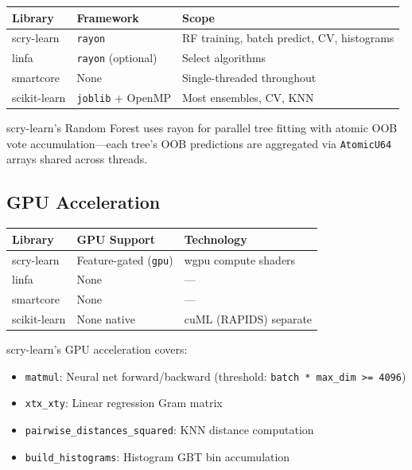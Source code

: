 \documentclass[11pt,a4paper]{article}
\begin{document}
\begin{center}
\begin{tabular}{lll}
\toprule
\textbf{Library} & \textbf{Framework} & \textbf{Scope} \\
\midrule
scry-learn & \texttt{rayon} & RF training, batch predict, CV, histograms \\
linfa & \texttt{rayon} (optional) & Select algorithms \\
smartcore & None & Single-threaded throughout \\
scikit-learn & \texttt{joblib} + OpenMP & Most ensembles, CV, KNN \\
\bottomrule
\end{tabular}
\end{center}

scry-learn's Random Forest uses rayon for parallel tree fitting with atomic OOB vote accumulation---each tree's OOB predictions are aggregated via \texttt{AtomicU64} arrays shared across threads.

\subsection{GPU Acceleration}

\begin{center}
\begin{tabular}{lll}
\toprule
\textbf{Library} & \textbf{GPU Support} & \textbf{Technology} \\
\midrule
scry-learn & Feature-gated (\texttt{gpu}) & wgpu compute shaders \\
linfa & None & --- \\
smartcore & None & --- \\
scikit-learn & None native & cuML (RAPIDS) separate \\
\bottomrule
\end{tabular}
\end{center}

scry-learn's GPU acceleration covers:
\begin{itemize}[itemsep=2pt]
\item \texttt{matmul}: Neural net forward/backward (threshold: \texttt{batch * max\_dim >= 4096})
\item \texttt{xtx\_xty}: Linear regression Gram matrix
\item \texttt{pairwise\_distances\_squared}: KNN distance computation
\item \texttt{build\_histograms}: Histogram GBT bin accumulation
\end{itemize}
\end{document}

